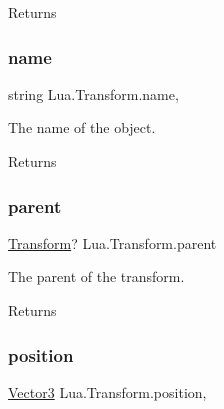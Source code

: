 \begin{DoxyReturn}{Returns}

\end{DoxyReturn}
\mbox{\label{class_lua_1_1_transform_af1ca076a9406c3865fef9cbf8393e484}} 
\subsubsection{\texorpdfstring{name}{name}}
{\footnotesize\ttfamily string Lua.\+Transform.\+name\hspace{0.3cm}{\ttfamily [get]}, {\ttfamily [set]}}



The name of the object. 

\begin{DoxyReturn}{Returns}

\end{DoxyReturn}
\mbox{\label{class_lua_1_1_transform_a8b6f784d7b29fbff37daec2e2001d991}} 
\subsubsection{\texorpdfstring{parent}{parent}}
{\footnotesize\ttfamily \mbox{\hyperlink{class_lua_1_1_transform}{Transform}}? Lua.\+Transform.\+parent\hspace{0.3cm}{\ttfamily [get]}}



The parent of the transform. 

\begin{DoxyReturn}{Returns}

\end{DoxyReturn}
\mbox{\label{class_lua_1_1_transform_a789b6abed611a7576ca2262bb9c5e6c3}} 
\subsubsection{\texorpdfstring{position}{position}}
{\footnotesize\ttfamily \mbox{\hyperlink{class_lua_1_1_vector3}{Vector3}} Lua.\+Transform.\+position\hspace{0.3cm}{\ttfamily [get]}, {\ttfamily [set]}}



